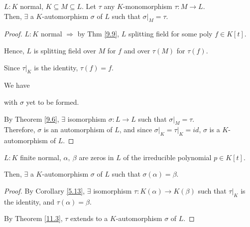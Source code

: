 \documentclass{article}
\theoremstyle{definition}
\newenvironment{thm}[1]
{\renewcommand\theinnerthm{#1}\innerthm}
{\endinnerthm}
\newenvironment{prop}[1]
{\renewcommand\theinnerprop{#1}\innerprop}
{\endinnerprop}
\begin{document}
\begin{thm}{11.3} \label{11.3}
  $L:K$ normal, $K \subseteq M \subseteq L$. Let $\tau$ any $K$-monomorphism $\tau: M \longrightarrow L$.\\
  Then, $\exists$ a $K$-automorphism $\sigma$ of $L$ such that $\sigma\biggr\vert_M=\tau$.
\end{thm}
\begin{proof}
  $L:K$ normal $\Longrightarrow$ by Thm \ref{9.9}, $L$ splitting field for some poly $f \in K[t]$.

  Hence, $L$ is splitting field over $M$ for $f$ and over $\tau(M)$ for $\tau(f)$.

  Since $\tau \biggr\vert_K$ is the identity, $\tau(f)=f$.

  \vspace{0.5cm}
  We have


  with $\sigma$ yet to be formed.

  By Theorem \ref{9.6}, $\exists$ isomorphism $\sigma: L \longrightarrow L$ such that $\sigma \biggr\vert_M = \tau$.\\
  Therefore, $\sigma$ is an automorphism of $L$, and since $\sigma\biggr\vert_K = \tau\biggr\vert_K=id$, $\sigma$ is a $K$-automorphism of $L$.
\end{proof}

\begin{prop}{11.4} \label{11.4}
  $L:K$ finite normal, $\alpha,~\beta$ are zeros in $L$ of the irreducible polynomial $p \in K[t]$.

  Then, $\exists$ a $K$-automorphism $\sigma$ of $L$ such that $\sigma(\alpha)=\beta$.
\end{prop}
\begin{proof}
  By Corollary \ref{5.13}, $\exists$ isomorphism $\tau: K(\alpha) \longrightarrow K(\beta)$ such that $\tau \biggr\vert_K$ is the identity, and $\tau(\alpha)=\beta$.

  By Theorem \ref{11.3}, $\tau$ extends to a $K$-automorphism $\sigma$ of $L$.
\end{proof}
\end{document}
